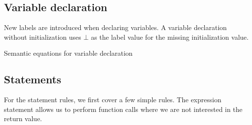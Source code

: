 \subsection{Variable declaration}
New labels are introduced when declaring variables.
A variable declaration without initialization uses $\bot$ as the label value for the missing initialization value.

\begin{table}[H]
\begin{semanticequations}
 \seSpace
\end{semanticequations}
\caption{Semantic equations for variable declaration}
\label{cstr:variabledeclaration}
\end{table}

\subsection{Statements}
For the statement rules, we first cover a few simple rules.
The expression statement allows us to perform function calls where we are not interested in the return value.

